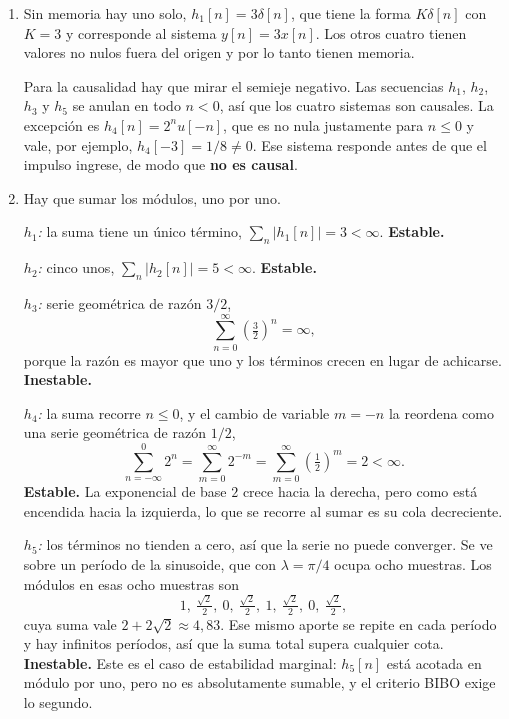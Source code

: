 \documentclass[10pt,a4paper]{article}
\begin{document}
	\begin{enumerate}
		\item Sin memoria hay uno solo, $h_1[n]=3\delta[n]$,
		que tiene la forma $K\delta[n]$ con $K=3$ y corresponde al sistema $y[n]=3x[n]$. Los
		otros cuatro tienen valores no nulos fuera del origen y por lo tanto tienen memoria.

		Para la causalidad hay que mirar el semieje negativo. Las secuencias $h_1$, $h_2$,
		$h_3$ y $h_5$ se anulan en todo $n<0$, así que los cuatro sistemas son causales. La
		excepción es $h_4[n]=2^n u[-n]$, que es no nula justamente para $n\le 0$ y vale, por
		ejemplo, $h_4[-3]=1/8 \neq 0$. Ese sistema responde antes de que el impulso ingrese,
		de modo que \textbf{no es causal}.

		\item Hay que sumar los módulos, uno por uno.

		\emph{$h_1$:} la suma tiene un único término, $\sum_n |h_1[n]| = 3 < \infty$.
		\textbf{Estable.}

		\emph{$h_2$:} cinco unos, $\sum_n |h_2[n]| = 5 < \infty$. \textbf{Estable.}

		\emph{$h_3$:} serie geométrica de razón $3/2$,
		\[
			\sum_{n=0}^{\infty}\left(\tfrac{3}{2}\right)^{\!n} = \infty,
		\]
		porque la razón es mayor que uno y los términos crecen en lugar de achicarse.
		\textbf{Inestable.}

		\emph{$h_4$:} la suma recorre $n\le 0$, y el cambio de variable $m=-n$ la reordena
		como una serie geométrica de razón $1/2$,
		\[
			\sum_{n=-\infty}^{0} 2^{n} = \sum_{m=0}^{\infty} 2^{-m}
			= \sum_{m=0}^{\infty}\left(\tfrac{1}{2}\right)^{\!m} = 2 < \infty.
		\]
		\textbf{Estable.} La exponencial de base $2$ crece hacia la derecha, pero como está
		encendida hacia la izquierda, lo que se recorre al sumar es su cola decreciente.

		\emph{$h_5$:} los términos no tienden a cero, así que la serie no puede converger.
		Se ve sobre un período de la sinusoide, que con $\lambda=\pi/4$ ocupa ocho muestras.
		Los módulos en esas ocho muestras son
		\[
			1,\ \tfrac{\sqrt{2}}{2},\ 0,\ \tfrac{\sqrt{2}}{2},\ 1,\ \tfrac{\sqrt{2}}{2},\ 0,\ \tfrac{\sqrt{2}}{2},
		\]
		cuya suma vale $2+2\sqrt{2}\approx 4{,}83$. Ese mismo aporte se repite en cada
		período y hay infinitos períodos, así que la suma total supera cualquier cota.
		\textbf{Inestable.} Este es el caso de estabilidad marginal: $h_5[n]$ está acotada en
		módulo por uno, pero no es absolutamente sumable, y el criterio BIBO exige lo
		segundo.


\end{enumerate}
\end{document}
